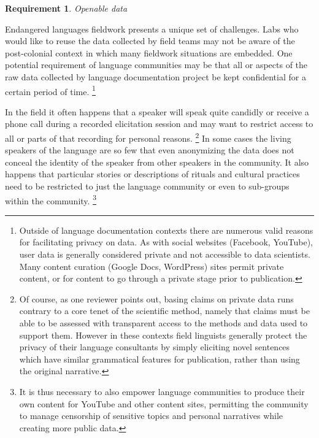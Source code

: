 \documentclass[11pt]{article}
\newtheorem{requirement}{Requirement}
\begin{document}




\begin{requirement}
	\label{req:openable}
       Openable data
\end{requirement}


Endangered languages fieldwork  presents a unique set of
challenges. 
Labs who would like to reuse the data collected by field teams may not be aware of the
post-colonial context in which many fieldwork situations are embedded.
One potential requirement of language communities may be that all or aspects of
the raw data collected by language documentation project be kept confidential for a certain period of time.%
\footnote{Outside of language documentation contexts there are numerous valid reasons for facilitating privacy on data.
As with social websites (Facebook, YouTube), user data is generally considered private and not accessible to data scientists.
Many content curation (Google Docs, WordPress) sites permit private content, or for content to go through a private stage prior to publication.}


In the field it often happens that a speaker will speak quite candidly or
receive a phone call  during a recorded elicitation session and may want to
restrict access to all or parts of that recording for personal reasons.%
\footnote{Of course, as one reviewer points out, basing claims on private data runs contrary to a core
    tenet of the scientific method, namely that claims must be able to be
    assessed with transparent access to the methods and data used to support
    them.  However in these contexts field linguists generally protect the
    privacy of their language consultants by simply eliciting novel sentences
    which have similar grammatical features for publication, rather than using
the original narrative.} %
In some cases the living speakers of the language are so few that even
anonymizing the data does not conceal the identity of the speaker from other
speakers in the community.
It also happens that particular stories or descriptions of rituals and cultural
practices need to be restricted to just the language community or even to
sub-groups within the community.%
\footnote{It is thus necessary to also empower language communities to produce
their own content for YouTube and other content sites, permitting the community
to manage censorship of  sensitive topics and personal narratives while
creating more public data.}
\end{document}
